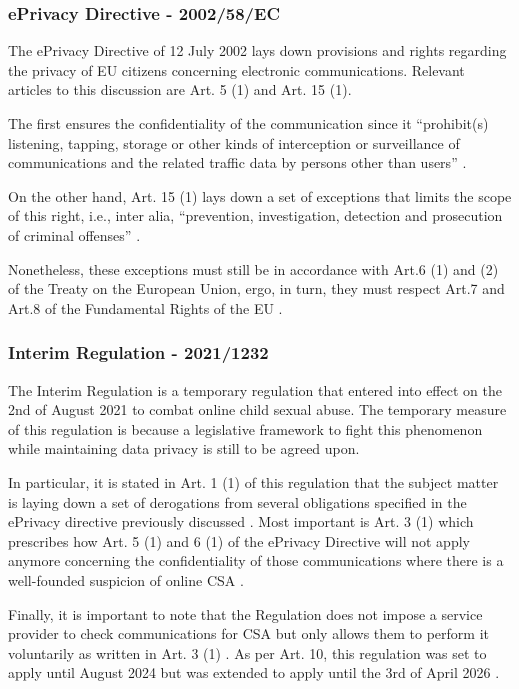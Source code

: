 \subsubsection{ePrivacy Directive - 2002/58/EC}
\label{sss:ePrivacy}

The ePrivacy Directive of 12 July 2002 lays down provisions and rights regarding the privacy of EU citizens concerning electronic communications. Relevant articles to this discussion are Art. 5 (1) and Art. 15 (1).

The first ensures the confidentiality of the communication since it ``prohibit(s) listening, tapping, storage or other kinds of interception or surveillance of communications and the related traffic data by persons other than users'' \cite{ePrivacy}. 

On the other hand, Art. 15 (1) lays down a set of exceptions that limits the scope of this right, i.e., inter alia, ``prevention, investigation, detection and prosecution of criminal offenses'' \cite{ePrivacy}. 

Nonetheless, these exceptions must still be in accordance with Art.6 (1) and (2) of the Treaty on the European Union, ergo, in turn, they must respect Art.7 and Art.8 of the Fundamental Rights of the EU \cite{ePrivacy} \cite{eu_charter_fundamental_rights} \cite{teu}.

\subsubsection{Interim Regulation - 2021/1232}

The Interim Regulation is a temporary regulation that entered into effect on the 2nd of August 2021 to combat online child sexual abuse. The temporary measure of this regulation is because a legislative framework to fight this phenomenon while maintaining data privacy is still to be agreed upon.

In particular, it is stated in Art. 1 (1) of this regulation that the subject matter is laying down a set of derogations from several obligations specified in the ePrivacy directive previously discussed \cite {interim_regualtion}. Most important is Art. 3 (1) which prescribes how Art. 5 (1) and 6 (1) of the ePrivacy Directive will not apply anymore concerning the confidentiality of those communications where there is a well-founded suspicion of online CSA \cite {interim_regualtion}.

Finally, it is important to note that the Regulation does not impose a service provider to check communications for CSA but only allows them to perform it voluntarily as written in Art. 3 (1) \cite {interim_regualtion}. As per Art. 10, this regulation was set to apply until August 2024 but was extended to apply until the 3rd of April 2026 \cite {interim_regualtion}.

